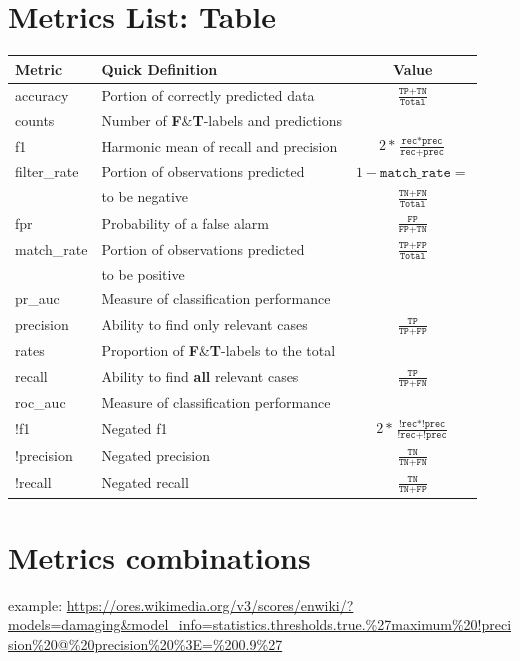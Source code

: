 \documentclass[12pt,a4paper]{article}
\begin{document}
\section{Metrics List: Table}
\begin{tabular}{|l|l|c|}
\hline
\textbf{Metric} & \textbf{Quick Definition} & \textbf{Value}\\\hline \hline
accuracy & Portion of correctly predicted data & $\frac{\texttt{TP}+\texttt{TN}}{\texttt{Total}}$\\\hline
counts & Number of \textbf{F}\&\textbf{T}-labels and predictions&\\\hline
f1 & Harmonic mean of recall and precision & $2*\frac{\texttt{rec} * \texttt{prec}}{\texttt{rec}+\texttt{prec}}$\\\hline
filter\_rate & Portion of observations predicted & $1-\texttt{match\_rate} =$\\ &to be negative&$\frac{\texttt{TN}+\texttt{FN}}{\texttt{Total}}$\\\hline
fpr & Probability of a false alarm & $\frac{\texttt{FP}}{\texttt{FP} + \texttt{TN}}$\\\hline
match\_rate & Portion of observations predicted & $\frac{\texttt{TP}+\texttt{FP}}{\texttt{Total}}$\\ &to be positive&\\\hline
pr\_auc & Measure of classification performance &\\\hline
precision & Ability to find only relevant cases & $\frac{\texttt{TP}}{\texttt{TP} + \texttt{FP}}$\\\hline
rates & Proportion of \textbf{F}\&\textbf{T}-labels to the total&\\\hline
recall & Ability to find \textbf{all} relevant cases & $\frac{\texttt{TP}}{\texttt{TP} + \texttt{FN}}$\\\hline
roc\_auc & Measure of classification performance &\\\hline
!f1 & Negated f1 & $2*\frac{\texttt{!rec} * \texttt{!prec}}{\texttt{!rec}+\texttt{!prec}}$\\\hline
!precision & Negated precision & $\frac{\texttt{TN}}{\texttt{TN} + \texttt{FN}}$ \\\hline
!recall & Negated recall & $\frac{\texttt{TN}}{\texttt{TN} + \texttt{FP}}$\\\hline
\end{tabular}
%
%
%
\section{Metrics combinations}
example: \url{https://ores.wikimedia.org/v3/scores/enwiki/?models=damaging&model_info=statistics.thresholds.true.%27maximum%20!precision%20@%20precision%20%3E=%200.9%27}
%
%
%
\end{document}
